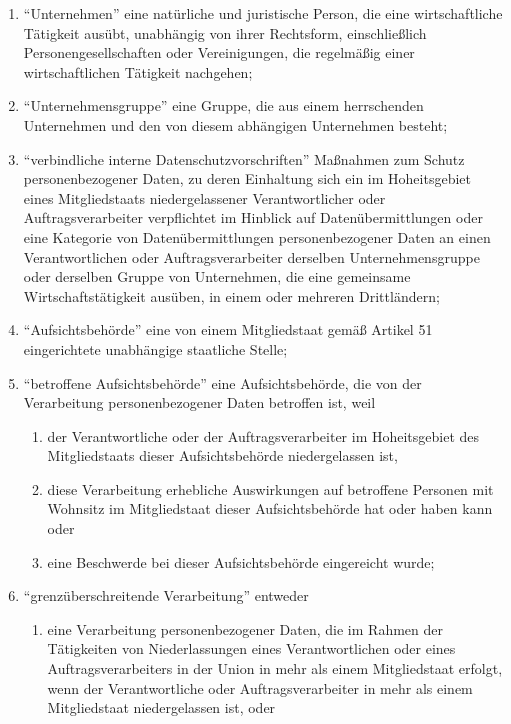 \documentclass[A4, 12pt]{scrbook}
\begin{document}
\begin{enumerate}[label=\arabic*.]
            \item ``Unternehmen'' eine natürliche und juristische Person, die eine wirtschaftliche Tätigkeit ausübt, unabhängig von ihrer Rechtsform, einschließlich Personengesellschaften oder Vereinigungen, die regelmäßig einer wirtschaftlichen Tätigkeit nachgehen;
            \item ``Unternehmensgruppe'' eine Gruppe, die aus einem herrschenden Unternehmen und den von diesem abhängigen Unternehmen besteht; 
            \item ``verbindliche interne Datenschutzvorschriften'' Maßnahmen zum Schutz personenbezogener Daten, zu deren Einhaltung sich ein im Hoheitsgebiet eines Mitgliedstaats niedergelassener Verantwortlicher oder Auftragsverarbeiter verpflichtet im Hinblick auf Datenübermittlungen oder eine Kategorie von Datenübermittlungen personenbezogener Daten an einen Verantwortlichen oder Auftragsverarbeiter derselben Unternehmensgruppe oder derselben Gruppe von Unternehmen, die eine gemeinsame Wirtschaftstätigkeit ausüben, in einem oder mehreren Drittländern;
            \item ``Aufsichtsbehörde'' eine von einem Mitgliedstaat gemäß Artikel 51 eingerichtete unabhängige staatliche Stelle; 
            \item ``betroffene Aufsichtsbehörde'' eine Aufsichtsbehörde, die von der Verarbeitung personenbezogener Daten betroffen ist, weil
                \begin{enumerate}[label=\alph*)]
                    \item der Verantwortliche oder der Auftragsverarbeiter im Hoheitsgebiet des Mitgliedstaats dieser Aufsichtsbehörde niedergelassen ist,
                    \item diese Verarbeitung erhebliche Auswirkungen auf betroffene Personen mit Wohnsitz im Mitgliedstaat dieser Aufsichtsbehörde hat oder haben kann oder
                    \item eine Beschwerde bei dieser Aufsichtsbehörde eingereicht wurde;
                \end{enumerate}
            \item ``grenzüberschreitende Verarbeitung'' entweder
                \begin{enumerate}[label=\alph*)]
                    \item eine Verarbeitung personenbezogener Daten, die im Rahmen der Tätigkeiten von Niederlassungen eines Verantwortlichen oder eines Auftragsverarbeiters in der Union in mehr als einem Mitgliedstaat erfolgt, wenn der Verantwortliche oder Auftragsverarbeiter in mehr als einem Mitgliedstaat niedergelassen ist, oder

\end{enumerate}
\end{enumerate}
\end{document}
